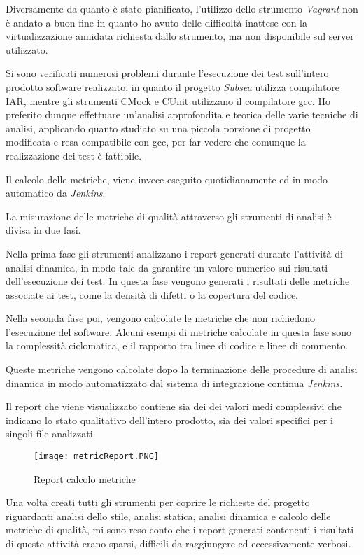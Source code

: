 Diversamente da quanto è stato pianificato, l'utilizzo dello strumento \textit{Vagrant} non è andato a buon fine in quanto ho avuto delle difficoltà inattese con la virtualizzazione annidata richiesta dallo strumento, ma non disponibile sul server utilizzato.

Si sono verificati numerosi problemi durante l'esecuzione dei test sull'intero prodotto software realizzato, in quanto il progetto \textit{Subsea} utilizza compilatore IAR, mentre gli strumenti CMock e CUnit utilizzano il compilatore gcc. Ho preferito dunque effettuare un'analisi approfondita e teorica delle varie tecniche di analisi, applicando quanto studiato su una piccola porzione di progetto modificata e resa compatibile con gcc, per far vedere che comunque la realizzazione dei test è fattibile.

\bigskip
Il calcolo delle metriche, viene invece eseguito quotidianamente ed in modo automatico da \textit{Jenkins}.

La misurazione delle metriche di qualità attraverso gli strumenti di analisi è divisa in due fasi. 

Nella prima fase gli strumenti analizzano i report generati durante l'attività di analisi dinamica, in modo tale da garantire un valore numerico sui risultati dell'esecuzione dei test. In questa fase vengono generati i risultati delle metriche associate ai test, come la densità di difetti o la copertura del codice.

Nella seconda fase poi, vengono calcolate le metriche che non richiedono l'esecuzione del software. Alcuni esempi di metriche calcolate in questa fase sono la complessità ciclomatica, e il rapporto tra linee di codice e linee di commento.

Queste metriche vengono calcolate dopo la terminazione delle procedure di analisi dinamica in modo automatizzato dal sistema di integrazione continua \textit{Jenkins.}

Il report che viene visualizzato contiene  sia dei dei valori medi complessivi che indicano lo stato qualitativo dell'intero prodotto, sia dei valori specifici per i singoli file analizzati.

\begin{figure}[H]
  \centering
  \texttt{[image: metricReport.PNG]}
  \caption{Report calcolo metriche}
\end{figure}
\bigskip

Una volta creati tutti gli strumenti per coprire le richieste del progetto riguardanti analisi dello stile, analisi statica, analisi dinamica e calcolo delle metriche di qualità, mi sono reso conto che i report generati contenenti i risultati di queste attività erano sparsi, difficili da raggiungere ed eccessivamente verbosi.

